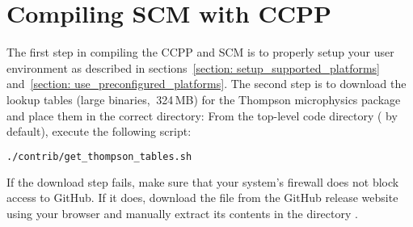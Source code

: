 \section{Compiling SCM with CCPP}
\label{section: compiling}
The first step in compiling the CCPP and SCM is to properly setup your user environment as described in sections~\ref{section: setup_supported_platforms} and~\ref{section: use_preconfigured_platforms}. The second step is to download the lookup tables (large binaries, $~$324\,MB) for the Thompson microphysics package and place them in the correct directory:
From the top-level code directory ( by default), execute the following script:
\begin{lstlisting}[language=bash]
./contrib/get_thompson_tables.sh
\end{lstlisting}
If the download step fails, make sure that your system's firewall does not block access to GitHub. If it does, download the file  from the GitHub release website using your browser and manually extract its contents in the directory .

